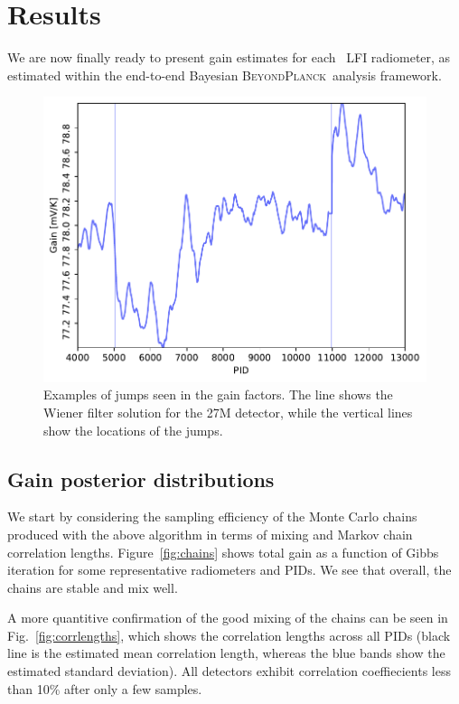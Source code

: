 \documentclass[twocolumn]{aa}
\newcommand{\BP}{\textsc{BeyondPlanck}}
\begin{document}
\section{Results}
\label{sec:results}

We are now finally ready to present gain estimates for each
\Planck\ LFI radiometer, as estimated within the end-to-end Bayesian
\BP\ analysis framework. 
\begin{figure}[t]
  \center
    \includegraphics[width=\linewidth]{figs/gain_jumps.pdf}
    \caption{Examples of jumps seen in the gain factors. The line shows the Wiener filter solution for the 27M detector, while the vertical lines show the locations of the jumps.}
  \label{fig:gain_jumps}
\end{figure}


\subsection{Gain posterior distributions}

We start by considering the sampling efficiency of the Monte Carlo
chains produced with the above algorithm in terms of mixing and Markov
chain correlation lengths. Figure~\ref{fig:chains} shows total gain as
a function of Gibbs iteration for some representative radiometers and
PIDs. We see that overall, the chains are stable and mix well.

A more quantitive confirmation of the good mixing of the chains can be seen in
Fig.~\ref{fig:corrlengths}, which shows the correlation lengths across all
PIDs (black line is the estimated mean correlation length, whereas the blue
bands show the estimated standard deviation). All detectors exhibit
correlation coeffiecients less than 10\% after only a few samples.
\end{document}

